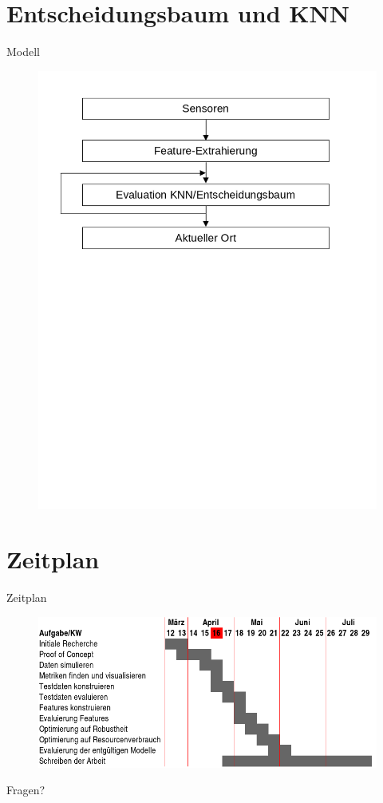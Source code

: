 \documentclass[10pt]{beamer}
\begin{document}
\section{Entscheidungsbaum und KNN}
\begin{frame}{Modell}
    \begin{figure}
        \centering
        \includegraphics[width=\linewidth]{modell.png}
    \end{figure}
\end{frame}

\section{Zeitplan}
\begin{frame}{Zeitplan}
\begin{figure}
    \centering
    \includegraphics[width=\linewidth]{Projektplan.png}
\end{figure}
\end{frame}
\begin{frame}[standout]
  Fragen?
\end{frame}
\end{document}
